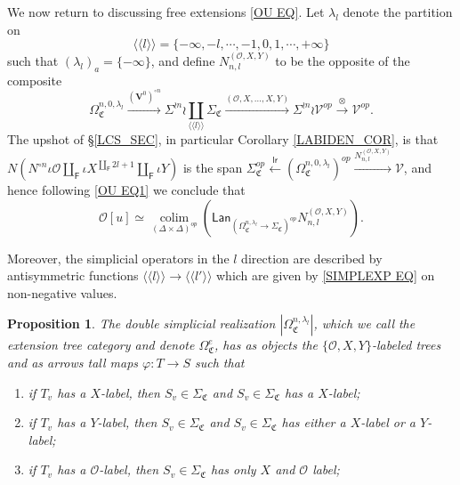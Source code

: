 \documentclass[a4paper,10pt
,draft
]{article}%
\numberwithin{equation}{section}
\numberwithin{figure}{section}
\newtheorem{proposition}[equation]{Proposition}%
\theoremstyle{definition} %
\DeclareMathOperator{\colim}{colim}%
\newcommand{\V}{\ensuremath{\mathcal V}}
\renewcommand{\O}{\ensuremath{\mathcal O}}
\newcommand{\1}{\ensuremath{\mathbbm 1}}%
\newcommand{\OC}{\Omega_{\mathfrak C}}
\begin{document}
We now return to discussing free extensions \eqref{OU EQ}.
%
Let $\lambda_l$ denote the partition on 
\[
\langle \langle l \rangle \rangle
=
\{-\infty,-l,\cdots,-1,0,1,\cdots,+\infty\}
\]
such that $\left(\lambda_l\right)_a = \{-\infty\}$,
and define $N_{n,l}^{(\O,X,Y)}$ to be the opposite of the composite
\[
      \Omega_{\mathfrak C}^{n,0,\lambda_l} \xrightarrow{(\boldsymbol{V}^0)^{\circ n}}
      \Sigma^{\wr n} \wr \coprod_{\langle \langle l \rangle \rangle} \Sigma_{\mathfrak C} \xrightarrow{(\O,X,\dots,X,Y)}
      \Sigma^{\wr n} \wr \V^{op} \xrightarrow{\otimes}
      \V^{op}.
\]
The upshot of \S \ref{LCS_SEC}, in particular Corollary \ref{LABIDEN_COR}, is that
$\mbox{$N \left(N^{\circ n} \iota \O \amalg_{\mathsf{F}} \iota X^{\amalg_{\mathsf{F}} 2l +1}\amalg_{\mathsf{F}} \iota Y \right)$}$
is the span
$\mbox{$\Sigma_{\mathfrak C}^{op} \xleftarrow{\mathsf{lr}} (\Omega_{\mathfrak C}^{n,0,\lambda_l})^{op} \xrightarrow{N_{n,l}^{(\O,X,Y)}} \V$}$,
and hence following \eqref{OU EQ1} we conclude that
\begin{equation}\label{1STRED EQ}
\O[u] \simeq
\mathop{\colim}\limits_{(\Delta \times \Delta)^{op}}
\left(
	\mathsf{Lan}_{\left(\Omega_{\mathfrak C}^{n,\lambda_l} \to \Sigma_{\mathfrak C}\right)^{op}} N_{n,l}^{(\O,X,Y)}
\right).
\end{equation}


Moreover, the simplicial operators in the $l$ direction are described by antisymmetric functions $\langle \langle l \rangle \rangle
 \to \langle \langle l' \rangle \rangle
$
which are given by \eqref{SIMPLEXP EQ} on non-negative values.


\begin{proposition}\label{EXTENTREE PROP}
The double simplicial realization
$|\Omega_{\mathfrak C}^{n,\lambda_l}|$,
which we call the \textit{extension tree category}
and denote
$\OC^e$, has as objects the 
$\{\O,X,Y\}$-labeled trees
and as arrows tall maps $\varphi \colon T \to S$ such that
\begin{enumerate}[label=(\roman*)]
\item if $T_v$ has a $X$-label, then 
$S_v \in \Sigma_{\mathfrak{C}}$ and
$S_v \in \Sigma_{\mathfrak{C}}$ has a $X$-label;
\item if $T_v$ has a $Y$-label, then 
$S_v \in \Sigma_{\mathfrak{C}}$ and
$S_v \in \Sigma_{\mathfrak{C}}$ has either a $X$-label or a $Y$-label;
\item if $T_v$ has a $\O$-label, then 
$S_v \in \Sigma_{\mathfrak{C}}$ has only $X$ and $\O$ label;
\end{enumerate}
\end{proposition}
\end{document}
